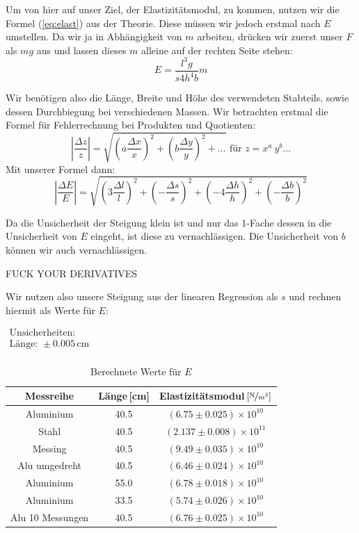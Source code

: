 \documentclass[11pt,a4paper]{article}
\newcommand\prodquo{\begin{equation}\left\vert\frac{\Delta z}{z}\right\vert=\sqrt{\left(a\frac{\Delta x}{x}\right)^2+\left(b\frac{\Delta y}{y}\right)^2+\ldots}\textrm{ f\"ur }z=x^a\ y^b\ldots\end{equation}}
\begin{document}
Um von hier auf unser Ziel, der Elastizit\"atsmodul, zu kommen, nutzen wir die Formel (\ref{eq:elast}) aus der Theorie. Diese m\"ussen wir jedoch erstmal nach $E$ umstellen. Da wir ja in Abh\"angigkeit von $m$ arbeiten, dr\"ucken wir zuerst unser $F$ als $mg$ aus und lassen dieses $m$ alleine auf der rechten Seite stehen:
\[
E=\frac{l^3g}{s4h^4b}m
\]

Wir ben\"otigen also die L\"ange, Breite und H\"ohe des verwendeten Stabteils, sowie dessen Durchbiegung bei verschiedenen Massen. Wir betrachten erstmal die Formel f\"ur Fehlerrechnung bei Produkten und Quotienten:
\prodquo
Mit unserer Formel dann:
\begin{equation}
\left\vert\frac{\Delta E}{E}\right\vert=\sqrt{\left(3\frac{\Delta l}{l}\right)^2+\left(-\frac{\Delta s}{s}\right)^2+\left(-4\frac{\Delta h}{h}\right)^2+\left(-\frac{\Delta b}{b}\right)^2}
\end{equation}

Da die Unsicherheit der Steigung klein ist und nur das 1-Fache dessen in die Unsicherheit von $E$ eingeht, ist diese zu vernachl\"assigen. Die Unsicherheit von $b$ k\"onnen wir auch vernachl\"assigen.

FUCK YOUR DERIVATIVES

\pagebreak

Wir nutzen also unsere Steigung aus der linearen Regression als $s$ und rechnen hiermit als Werte f\"ur $E$:

\begin{table}[h]
\centering
\caption{Berechnete Werte f\"ur $E$} \vspace{11pt}
$\begin{array}{l}
\textrm{Unsicherheiten:}\\
\textrm{L\"ange: } \pm 0.005\,\textrm{cm}\\
\end{array}$
\begin{tabular}{ccc}
\toprule
\textrm{Messreihe} & \textrm{L\"ange}\,[\textrm{cm}] & \textrm{Elastizit\"atsmodul}\,$\left[\nicefrac{\mathrm{N}}{\mathrm{m^2}}\right]$ \\
\midrule 
\textrm{Aluminium} & 40.5 & $(6.75\pm0.025)\times10^{10}$ \\
\textrm{Stahl} & 40.5 & $(2.137\pm0.008)\times10^{11}$ \\
\textrm{Messing} & 40.5 & $(9.49\pm0.035)\times10^{10}$ \\
\hline
\textrm{Alu umgedreht} & 40.5 & $(6.46\pm0.024)\times10^{10}$ \\
\textrm{Aluminium} & 55.0 & $(6.78\pm0.018)\times10^{10}$ \\ 
\textrm{Aluminium} & 33.5 & $(5.74\pm0.026)\times10^{10}$ \\ 
\textrm{Alu 10 Messungen} & 40.5 & $(6.76\pm0.025)\times10^{10}$ \\ 
\bottomrule
\end{tabular}
\label{Tab:1}
\end{table}
\end{document}
